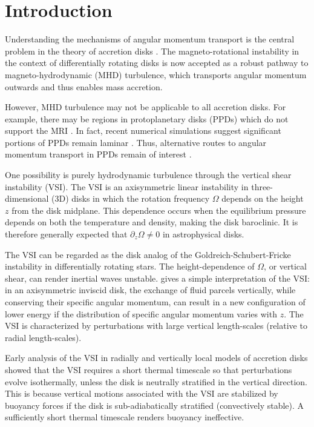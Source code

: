 \documentclass[iop]{emulateapj}
\newcommand{\p}{\partial}
\begin{document}
\section{Introduction}
Understanding the mechanisms of angular momentum transport is the
central problem in the theory of accretion disks 
\citep{lyndenbell74}. The   
magneto-rotational instability in the context of differentially
rotating disks \citep[MRI,][]{balbus91} is now accepted as a robust
pathway to magneto-hydrodynamic (MHD) turbulence, which transports
angular momentum outwards and thus enables mass accretion. 

However, MHD turbulence may not be applicable to all  
accretion disks. For example, there may be regions in protoplanetary  
disks (PPDs) which do not support the MRI 
\citep{gammie96,landry13}. In fact, recent  numerical simulations
suggest significant portions of PPDs remain laminar \citep[e.g.][and references
therein]{lesur14,bai15,gressel15}. Thus, alternative routes 
to angular momentum transport in PPDs remain of interest
\citep{armitage10}. 
 
One possibility is purely hydrodynamic turbulence through the vertical
shear instability (VSI). The VSI is an axisymmetric linear instability
in three-dimensional (3D) disks in which the rotation frequency
$\Omega$ depends on the height $z$ from the disk midplane. This
dependence occurs when the equilibrium pressure depends on both the
temperature and density, making the disk baroclinic. It is therefore
generally expected that $\p_z\Omega\neq 0$ in astrophysical disks.  

The VSI can be regarded as the disk analog of the
Goldreich-Schubert-Fricke instability 
\citep[GSF,][]{goldreich67,fricke68} in differentially rotating stars.   
The height-dependence of $\Omega$, or vertical shear, can render
inertial waves unstable. \cite{barker15} gives a simple 
interpretation of the VSI: in an axisymmetric inviscid disk, the 
exchange of fluid parcels vertically, while conserving their specific angular
momentum, can result in a new configuration of lower energy if the
distribution of specific angular momentum varies with $z$. The VSI is
characterized by perturbations with large vertical length-scales
(relative to radial length-scales). 

Early analysis of the VSI in radially and vertically local 
models of accretion disks \citep{urpin98,urpin03} showed that the VSI
requires a short thermal timescale so that perturbations evolve 
isothermally, unless the disk is neutrally stratified in the vertical
direction. This is because vertical motions associated with the VSI
are stabilized by buoyancy forces if the disk is sub-adiabatically
stratified (convectively stable). A sufficiently short thermal
timescale renders buoyancy ineffective.    
\end{document}
